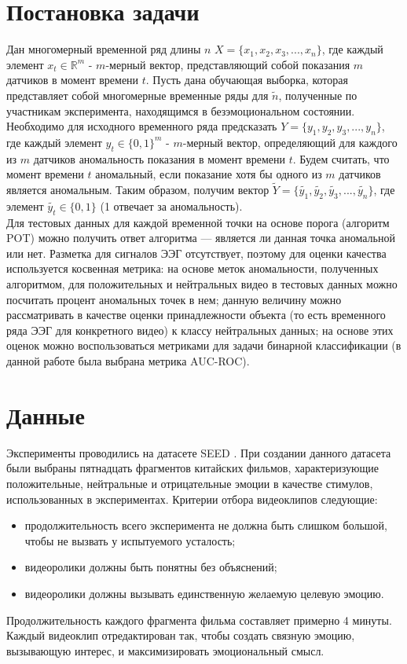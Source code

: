 \documentclass{article}
\begin{document}
\section{Постановка задачи}
Дан многомерный временной ряд длины $n$ $X = \{x_1, x_2, x_3, ..., x_n\}$, где каждый элемент $x_t \in \mathbb{R}^{m}$ - $m$-мерный вектор, представляющий собой показания $m$ датчиков в момент времени $t$. Пусть  дана обучающая выборка, которая представляет собой многомерные временные ряды для $\widetilde{n}$, полученные по участникам эксперимента, находящимся в безэмоциональном состоянии. Необходимо для исходного временного ряда предсказать $Y = \{y_1, y_2, y_3, ..., y_n\}$, где каждый элемент $y_t \in \{0, 1\}^{m}$ - $m$-мерный вектор, определяющий для каждого из $m$ датчиков аномальность показания в момент времени $t$. Будем считать, что момент времени $t$ аномальный, если показание хотя бы одного из $m$ датчиков является аномальным. Таким образом, получим вектор $\widetilde{Y} = \{\widetilde{y_1}, \widetilde{y_2}, \widetilde{y_3}, ..., \widetilde{y_n}\}$, где элемент $\widetilde{y_t} \in \{0, 1\}$ (1 отвечает за аномальность). \\
Для тестовых данных для каждой временной точки на основе порога (алгоритм POT) можно получить ответ алгоритма --- является ли данная точка аномальной или нет. Разметка для сигналов ЭЭГ отсутствует, поэтому для оценки качества используется косвенная метрика: на основе меток аномальности, полученных алгоритмом, для положительных и нейтральных видео в тестовых данных можно посчитать процент аномальных точек в нем; данную величину можно рассматривать в качестве оценки принадлежности объекта (то есть временного ряда ЭЭГ для конкретного видео) к классу нейтральных данных; на основе этих оценок можно воспользоваться метриками для задачи бинарной классификации (в данной работе была выбрана метрика AUC-ROC).

\section{Данные}
Эксперименты проводились на датасете SEED \cite{seed}. При создании данного датасета были выбраны пятнадцать фрагментов китайских фильмов, характеризующие положительные, нейтральные и отрицательные эмоции в качестве стимулов, использованных в экспериментах. Критерии отбора видеоклипов следующие:
\begin{itemize}
    \item продолжительность всего эксперимента не должна быть слишком большой, чтобы не вызвать у испытуемого усталость;
    \item  видеоролики должны быть понятны без объяснений;
    \item видеоролики должны вызывать единственную желаемую целевую эмоцию.
\end{itemize}
Продолжительность каждого фрагмента фильма составляет примерно 4 минуты. Каждый видеоклип отредактирован так, чтобы создать связную эмоцию, вызывающую интерес, и максимизировать эмоциональный смысл. 
\end{document}
